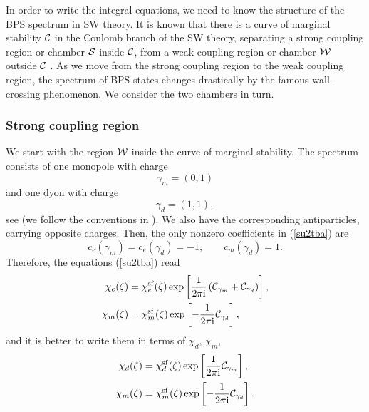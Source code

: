 \documentclass[a4paper,11pt]{article}
\theoremstyle{definition}
\newcommand{\CC}{{\cal C}}
\newcommand{\CW}{{\cal W}}
\newcommand{\ri}{{\rm i}}
\newcommand{\ba}{\begin{aligned}}
\newcommand{\ea}{\end{aligned}}
\begin{document}
In order to write the integral equations, we need to know the
structure of the BPS spectrum in SW theory. It is known that there is
a curve of marginal stability ${\cal C}$ in the Coulomb branch of the
SW theory, separating a strong coupling region or chamber ${\cal S}$
inside ${\cal C}$, from a weak coupling region or chamber ${\cal W}$
outside ${\cal C}$ \cite{sw,fb,selfdual}. As we move from the strong
coupling region to the weak coupling region, the spectrum of BPS
states changes drastically by the famous wall-crossing phenomenon. We
consider the two chambers in turn.







\subsubsection{Strong coupling region}

We start with the region $\CW$ inside the curve of marginal
stability. The
spectrum consists of one monopole with charge
\begin{equation}
  \gamma_m=(0,1)
\end{equation}
and one dyon with charge
\begin{equation}
  \gamma_d=(1,1), 
\end{equation}
see \cite{sw,fb,selfdual} (we follow the conventions in \cite{fb}). We
also have the corresponding antiparticles, carrying opposite
charges. Then, the only nonzero coefficients in (\ref{su2tba}) are
\begin{equation}
  c_e(\gamma_m)=c_e(\gamma_d)=-1, \qquad c_m(\gamma_d)=1.
\end{equation}
Therefore, the equations (\ref{su2tba}) read
\begin{equation}
  \ba
  \chi_e (\zeta)&=  \chi^{\rm sf}_{e} (\zeta)\exp\left[{1\over 2 \pi
      \ri} \left( \CC_{\gamma_m}+ \CC_{\gamma_d} \right) \right],\\ 
  \chi_m (\zeta)&=  \chi^{\rm sf}_{m} (\zeta)\exp\left[-{1\over 2 \pi
      \ri} \CC_{\gamma_d} \right], 
  \ea
\end{equation}
%
and it is better to write them in terms of $\chi_d$, $\chi_m$,
%
\begin{equation}
  \ba
  \chi_d (\zeta)&=  \chi^{\rm sf}_{d} (\zeta)\exp\left[{1\over 2 \pi
      \ri}  \CC_{\gamma_m} \right],\\ 
  \chi_m (\zeta)&=  \chi^{\rm sf}_{m} (\zeta)\exp\left[-{1\over 2 \pi
      \ri} \CC_{\gamma_d} \right]. 
  \ea
\end{equation}
 
\end{document}
